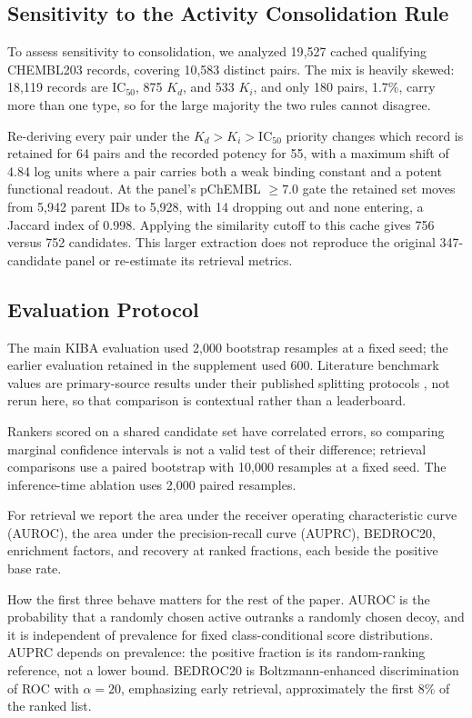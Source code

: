 \documentclass{ieeeaccess}
\begin{document}
\subsection{Sensitivity to the Activity Consolidation Rule}
\label{sec:curation}
To assess sensitivity to consolidation, we analyzed 19{,}527
cached qualifying CHEMBL203 records, covering 10{,}583 distinct pairs. The mix is
heavily skewed: 18{,}119 records are IC$_{50}$, 875 $K_d$, and 533 $K_i$, and
only 180 pairs, 1.7\%, carry more than one type, so for the large majority the
two rules cannot disagree.

Re-deriving every pair under the $K_d > K_i > \mathrm{IC}_{50}$ priority changes
which record is retained for 64 pairs and the recorded potency for 55, with a
maximum shift of 4.84 log units where a pair carries both a weak binding
constant and a potent functional readout. At the panel's pChEMBL $\geq 7.0$ gate
the retained set moves from 5{,}942 parent IDs to 5{,}928, with 14 dropping out
and none entering, a Jaccard index of 0.998. Applying the similarity cutoff to
this cache gives 756 versus 752 candidates. This larger extraction does not
reproduce the original 347-candidate panel or re-estimate its retrieval metrics.

\subsection{Evaluation Protocol}
The main KIBA evaluation used 2{,}000 bootstrap resamples at a fixed seed; the
earlier evaluation retained in the supplement used 600. Literature benchmark
values are primary-source results under their published splitting protocols
\cite{ozturk2018deepdta,ozturk2019widedta,nguyen2021graphdta,jiang2020dgraphdta,yang2022mgraphdta},
not rerun here, so that comparison is contextual rather than a leaderboard.

Rankers scored on a shared candidate set have correlated errors, so comparing
marginal confidence intervals is not a valid test of their difference;
retrieval comparisons use a paired bootstrap with 10{,}000 resamples at a
fixed seed. The inference-time ablation uses 2{,}000 paired resamples.

For retrieval we report the area under the receiver operating characteristic
curve (AUROC), the area under the precision-recall curve (AUPRC), BEDROC20,
enrichment factors, and recovery at ranked fractions, each beside the positive
base rate.

How the first three behave matters for the rest of the paper. AUROC is the
probability that a randomly chosen active outranks a randomly chosen decoy, and
it is independent of prevalence for fixed class-conditional score distributions.
AUPRC depends on prevalence: the positive fraction is its random-ranking
reference, not a lower bound. BEDROC20 is Boltzmann-enhanced discrimination of
ROC with $\alpha = 20$, emphasizing early retrieval, approximately the first
8\% of the ranked list.
\end{document}
